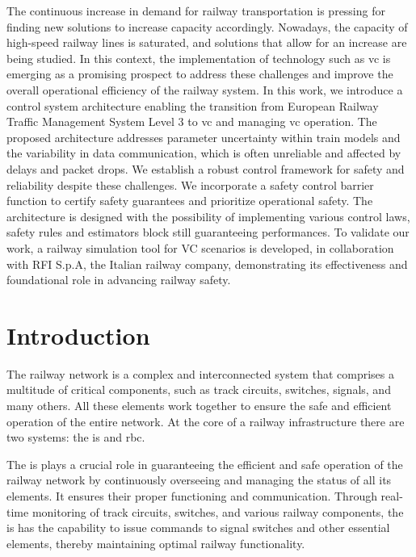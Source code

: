 The continuous increase in demand for railway transportation is pressing for finding new solutions to increase capacity accordingly. Nowadays, the capacity of high-speed railway lines is saturated, and solutions that allow for an increase are being studied. In this context, the implementation of technology such as \gls{vc} is emerging as a promising prospect to address these challenges and improve the overall operational efficiency of the railway system. In this work, we introduce a control system architecture enabling the transition from European Railway Traffic Management System Level 3 to \gls{vc} and managing \gls{vc} operation. The proposed architecture addresses parameter uncertainty within train models and the variability in data communication, which is often unreliable and affected by delays and packet drops. We establish a robust control framework for safety and reliability despite these challenges. We incorporate a safety control barrier function to certify safety guarantees and prioritize operational safety. The architecture is designed with the possibility of implementing various control laws, safety rules and estimators block still guaranteeing performances. To validate our work, a railway simulation tool for VC scenarios is developed, in collaboration with RFI S.p.A, the Italian railway company, demonstrating its effectiveness and foundational role in advancing railway safety.

\newpage

\section{Introduction}
%



The railway network is a complex and interconnected system that comprises a multitude of critical components, such as track circuits, switches, signals, and many others. All these elements work together to ensure the safe and efficient operation of the entire network. At the core of a railway infrastructure there are two systems: the \gls{is} and \gls{rbc}.



The \gls{is} plays a crucial role in guaranteeing the efficient and safe operation of the railway network by continuously overseeing and managing the status of all its elements. It ensures their proper functioning and communication. Through real-time monitoring of track circuits, switches, and various railway components, the \gls{is} has the capability to issue commands to signal switches and other essential elements, thereby maintaining optimal railway functionality.

